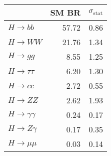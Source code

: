 \begin{tabular}{lrr}
\toprule
{} &  SM BR &  $\sigma_{\mathrm{stat}}$ \\
\midrule
$H\to bb$           &  57.72 &                      0.86 \\
$H\to WW$           &  21.76 &                      1.34 \\
$H\to gg$           &   8.55 &                      1.25 \\
$H\to \tau\tau$     &   6.20 &                      1.30 \\
$H\to cc$           &   2.72 &                      0.55 \\
$H\to ZZ$           &   2.62 &                      1.93 \\
$H\to \gamma\gamma$ &   0.24 &                      0.17 \\
$H\to Z\gamma$      &   0.17 &                      0.35 \\
$H\to \mu\mu$       &   0.03 &                      0.14 \\
\bottomrule
\end{tabular}
